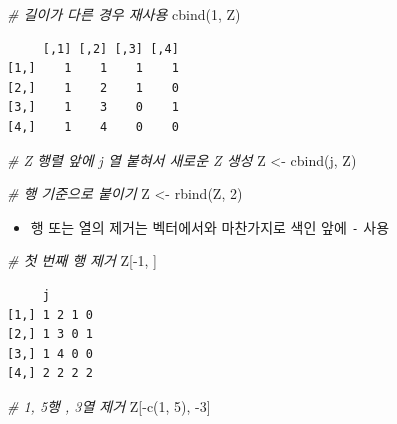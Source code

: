 \documentclass[
  11pt,
]{krantz}
\newenvironment{Shaded}{\begin{snugshade}}{\end{snugshade}}
\newcommand{\CommentTok}[1]{\textcolor[rgb]{0.37,0.37,0.37}{\textit{#1}}}
\newcommand{\DecValTok}[1]{\textcolor[rgb]{0.06,0.06,0.06}{#1}}
\newcommand{\FunctionTok}[1]{\textcolor[rgb]{0,0,0}{#1}}
\newcommand{\NormalTok}[1]{#1}
\newcommand{\OtherTok}[1]{\textcolor[rgb]{0.37,0.37,0.37}{#1}}
\newcommand{\SpecialCharTok}[1]{\textcolor[rgb]{0,0,0}{#1}}
\providecommand{\tightlist}{%
  \setlength{\itemsep}{0pt}\setlength{\parskip}{0pt}}
\begin{document}
\begin{Shaded}
\begin{Highlighting}[]
\CommentTok{\# 길이가 다른 경우 재사용}
\FunctionTok{cbind}\NormalTok{(}\DecValTok{1}\NormalTok{, Z)}
\end{Highlighting}
\end{Shaded}

\begin{verbatim}
     [,1] [,2] [,3] [,4]
[1,]    1    1    1    1
[2,]    1    2    1    0
[3,]    1    3    0    1
[4,]    1    4    0    0
\end{verbatim}

\begin{Shaded}
\begin{Highlighting}[]
\CommentTok{\# Z 행렬 앞에 j 열 붙혀서 새로운 Z 생성}
\NormalTok{Z }\OtherTok{\textless{}{-}} \FunctionTok{cbind}\NormalTok{(j, Z)}

\CommentTok{\# 행 기준으로 붙이기}
\NormalTok{Z }\OtherTok{\textless{}{-}} \FunctionTok{rbind}\NormalTok{(Z, }\DecValTok{2}\NormalTok{)}
\end{Highlighting}
\end{Shaded}

\normalsize

\begin{itemize}
\tightlist
\item
  행 또는 열의 제거는 벡터에서와 마찬가지로 색인 앞에 \texttt{-} 사용
\end{itemize}

\footnotesize

\begin{Shaded}
\begin{Highlighting}[]
\CommentTok{\# 첫 번째 행 제거}
\NormalTok{Z[}\SpecialCharTok{{-}}\DecValTok{1}\NormalTok{, ]}
\end{Highlighting}
\end{Shaded}

\begin{verbatim}
     j      
[1,] 1 2 1 0
[2,] 1 3 0 1
[3,] 1 4 0 0
[4,] 2 2 2 2
\end{verbatim}

\begin{Shaded}
\begin{Highlighting}[]
\CommentTok{\# 1, 5행 , 3열 제거}
\NormalTok{Z[}\SpecialCharTok{{-}}\FunctionTok{c}\NormalTok{(}\DecValTok{1}\NormalTok{, }\DecValTok{5}\NormalTok{), }\SpecialCharTok{{-}}\DecValTok{3}\NormalTok{]}
\end{Highlighting}
\end{Shaded}
\end{document}
